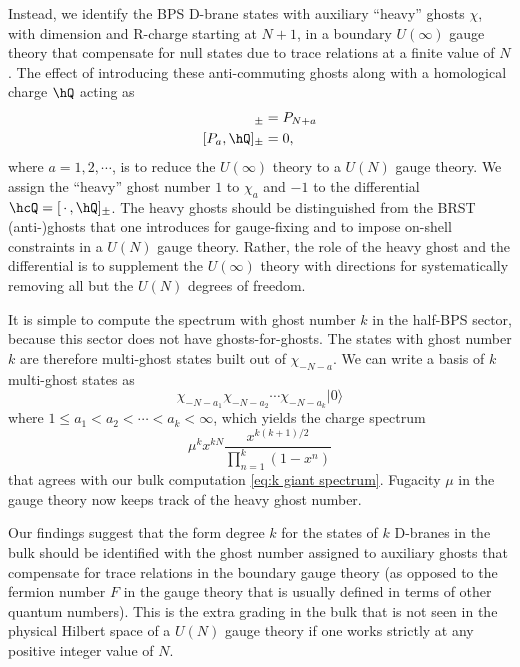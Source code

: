 \documentclass[a4paper,12pt]{article}
\begin{document}
Instead, we identify the BPS D-brane states with auxiliary ``heavy'' ghosts $\chi$, with dimension and R-charge starting at $N+1$, in a boundary $U(\infty)$ gauge theory that compensate for null states due to trace relations at a finite value of $N$. The effect of introducing these anti-commuting ghosts along with a homological charge $\hQ$ acting as
\begin{align}
    [\chi_{-N-a},\hQ]_\pm &= P_{N+a} \nonumber \\
    [P_a, \hQ]_\pm &= 0 ,
\end{align}
where $a=1,2, \cdots$, is to reduce the $U(\infty)$ theory to a $U(N)$ gauge theory. We assign the ``heavy'' ghost number $1$ to $\chi_a$ and $-1$ to the differential $\hcQ = [\, \cdot \, ,\hQ]_\pm$. The heavy ghosts should be distinguished from the BRST (anti-)ghosts that one introduces for gauge-fixing and to impose on-shell constraints in a $U(N)$ gauge theory. Rather, the role of the heavy ghost and the differential is to supplement the $U(\infty)$ theory with directions for systematically removing all but the $U(N)$ degrees of freedom.

It is simple to compute the spectrum with ghost number $k$ in the half-BPS sector, because this sector does not have ghosts-for-ghosts. The states with ghost number $k$ are therefore multi-ghost states built out of $\chi_{-N-a}$. We can write a basis of $k$ multi-ghost states as
\begin{equation}
\chi_{-N-a_1} \chi_{-N-a_2} \cdots \chi_{-N-a_k} |0\rangle
\end{equation}
where $1 \leq a_1 < a_2 < \cdots < a_k < \infty$, which yields the charge spectrum
\begin{equation}
\mu^k x^{k N} \frac{x^{k(k+1)/2}}{\prod_{n=1}^k (1- x^n)}
\end{equation}
that agrees with our bulk computation \eqref{eq:k giant spectrum}. Fugacity $\mu$ in the gauge theory now keeps track of the heavy ghost number.

Our findings suggest that the form degree $k$ for the states of $k$ D-branes in the bulk should be identified with the ghost number assigned to auxiliary ghosts that compensate for trace relations in the boundary gauge theory (as opposed to the fermion number $F$ in the gauge theory that is usually defined in terms of other quantum numbers). This is the extra grading in the bulk that is not seen in the physical Hilbert space of a $U(N)$ gauge theory if one works strictly at any positive integer value of $N$.
\end{document}
